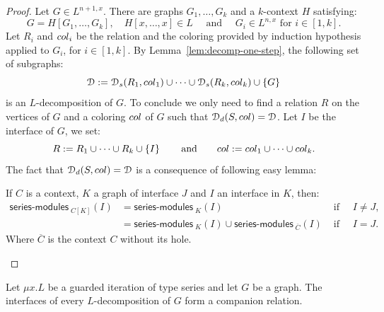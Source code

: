 \begin{proof}
 Let $G\in L^{n+1,x}$. There are graphs $G_1, \dots, G_k$ and a $k$-context $H$ satisfying:
 $$G=H[G_1,\dots, G_k], \quad H[x,\dots,x]\in L\quad \text{ and }\quad  G_i\in L^{n,x} \text{ for } i\in[1,k].$$
 Let $R_i$ and $\col_i$ be the relation and the coloring provided by induction hypothesis applied to $G_i$, for $i\in[1,k]$. 
 By Lemma~\ref{lem:decomp-one-step}, the following set of subgraphs:
 $$\cD:=\cD_\mathsf{s}(R_1,\col_1)\cup\dots\cup\cD_\mathsf{s}(R_k,\col_k)\cup\set{G}$$
 is an $L$-decomposition of $G$. To conclude we only need to find a relation $R$ on the vertices of $G$ and a coloring $\col$ of $G$ such that $\cD_\mathsf{d}(S,\col)=\cD$. Let $I$ be the interface of $G$, we set:
    $$R:=R_1\cup\dots\cup R_k\cup\set{I}\qquad \text{and}\qquad \col:=\col_1\cup\dots\cup \col_k.$$
The fact that $\cD_\mathsf{d}(S,\col)=\cD$ is a consequence of following easy lemma:
\begin{lemma}
If $C$ is a context, $K$ a graph of interface $J$ and $I$ an interface in $K$, then:
$$\begin{array}{llr}
\mathsf{series\text{-}modules}_{\;C[K]}(I)&=\mathsf{series\text{-}modules}_{\;K}(I) & \text{ if }\quad I\neq J, \\
&=\mathsf{series\text{-}modules}_{\;K}(I)\cup \mathsf{series\text{-}modules}_{\;\overline{C}}(I)  & \text{ if }\quad  I=J.
\end{array} $$
Where $\overline{C}$ is the context $C$ without its hole.
\end{lemma}
\end{proof}

\begin{proposition}\label{prop:interface-are-comp-series}
Let $\mu x. L$ be a guarded iteration of type series and let $G$ be a graph. The interfaces of every $L$-decomposition of $G$ form a companion relation.
\end{proposition}

